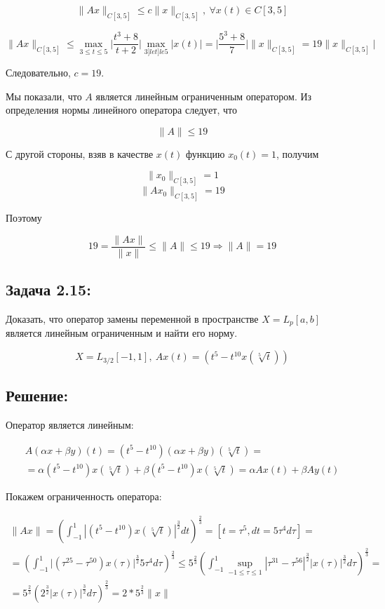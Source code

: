 \documentclass[12pt, a4paper]{report}
\begin{document}
\[ \| A x \|_{C[3, 5]} \le c \|x\|_{C[3, 5]},\ \forall x(t) \in C[3, 5] \]

\[\|Ax\|_{C[3, 5]} \le 
\max_{3 \le t \le 5} \Big| \frac{t^3 + 8}{t + 2}\Big| \max_{3 ]le t ]le 5}|x(t)| = 
\Big| \frac{5^3 + 8 }{7} \Big| \| x \|_{C[3, 5]} =19 \|x\|_{C[3, 5]}|\]

Следовательно, $c = 19$.

Мы показали, что $A$ является линейным ограниченным оператором. Из определения нормы линейного оператора следует, что 

\[\| A \| \le 19\]

С другой стороны, взяв в качестве $x(t)$ функцию $x_0(t) = 1$, получим

\[ \| x_0 \|_{C[3, 5]}  = 1 \]
\[ \| A x_0 \|_{C[3, 5]} = 19\]

Поэтому

\[19 = \frac{\| Ax \|}{\| x \|} \le \| A \| \le 19 \Rightarrow \|A\| = 19\]


\subsection*{Задача 2.15:}
Доказать, что оператор замены переменной в пространстве $X = L_p[a, b]$ является линейным ограниченным и найти его норму.

\[X = L_{3/2}[-1, 1],\ Ax(t) = (t^5 - t^{10}x(\sqrt[5]{t}))\]

\subsection*{Решение: }

Оператор является линейным:

\newpage

\begin{multline*}
    A(\alpha x + \beta y) (t) = (t^5 - t^{10}) (\alpha x + \beta y) (\sqrt[5]{t}) =\\= 
    \alpha (t^5 - t^{10}) x(\sqrt[5]{t}) + \beta (t^5 - t^{10}) x(\sqrt[5]{t}) = 
    \alpha A x(t) + \beta A y(t)
\end{multline*}

Покажем ограниченность оператора:

\begin{multline*}
    \| Ax \| = \left( \int_{ - 1}^{1} |(t^5 - t^{10}) x(\sqrt[5]{t}) |^\frac{3}{2} dt \right)^\frac{2}{3} =
    \left[ t = \tau^5, dt = 5 \tau^4 d\tau \right] =\\=
    \left( \int_{ -1}^{1} \Big| (\tau^{25} - \tau^{50}) x(\tau)|^\frac{3}{2} 5 \tau^4 d\tau \right)^\frac{2}{3} \le
    5^\frac{2}{3} \left( \int_{ - 1}^{1} \sup_{ -1 \le \tau \le 1} |\tau^{31} - \tau^{56}|^\frac{3}{2} |x(\tau)|^\frac{3}{2} d\tau  \right)^\frac{2}{3} =\\=
    5^\frac{2}{3} \left( 2^\frac{3}{2} |x(\tau)|^\frac{3}{2}d\tau  \right)^{\frac{2}{3}} =
    2 * 5^\frac{2}{3} \| x \|
\end{multline*}
\end{document}

